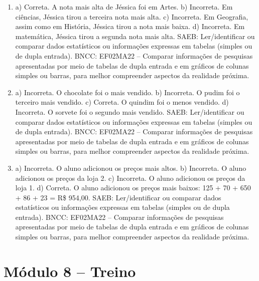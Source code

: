 \begin{enumerate}
\item
a) Correta. A nota mais alta de Jéssica foi em Artes.
b) Incorreta. Em ciências, Jéssica tirou a terceira nota mais alta.
c) Incorreta. Em Geografia, assim como em História, Jéssica tirou a nota mais baixa.
d) Incorreta. Em matemática, Jéssica tirou a segunda nota mais alta.
SAEB: Ler/identificar ou comparar dados estatísticos ou
informações expressas em tabelas (simples ou de dupla entrada).
BNCC: EF02MA22 -- Comparar informações de pesquisas apresentadas por meio
de tabelas de dupla entrada e em gráficos de colunas simples ou barras, para melhor
compreender aspectos da realidade próxima.

\item
a) Incorreta. O chocolate foi o mais vendido.
b) Incorreta. O pudim foi o terceiro mais vendido.
c) Correta. O quindim foi o menos vendido.
d) Incorreta. O sorvete foi o segundo mais vendido.
SAEB: Ler/identificar ou comparar dados estatísticos ou
informações expressas em tabelas (simples ou de dupla entrada).
BNCC: EF02MA22 -- Comparar informações de pesquisas apresentadas por meio
de tabelas de dupla entrada e em gráficos de colunas simples ou barras, para melhor
compreender aspectos da realidade próxima.

\item
a) Incorreta. O aluno adicionou os preços mais altos.
b) Incorreta. O aluno adicionou os preços da loja 2.
c) Incorreta. O aluno adicionou os preços da loja 1.
d) Correta. O aluno adicionou os preços mais baixos: 125 + 70 + 650 + 86 + 23 = R\$ 954,00.
SAEB: Ler/identificar ou comparar dados estatísticos ou
informações expressas em tabelas (simples ou de dupla entrada).
BNCC: EF02MA22 -- Comparar informações de pesquisas apresentadas por meio
de tabelas de dupla entrada e em gráficos de colunas simples ou barras, para melhor
compreender aspectos da realidade próxima.
\end{enumerate}

\section*{Módulo 8 – Treino}


